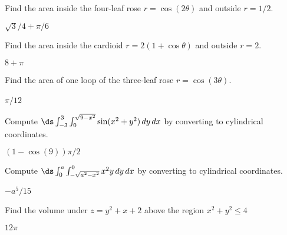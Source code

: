 \begin{exercises}
\begin{exercise} Find the area inside the four-leaf rose $r=\cos(2\theta)$
and outside $r=1/2$.
\begin{answer} $\sqrt3/4+\pi/6$
\end{answer}\end{exercise}

\begin{exercise} Find the area inside the cardioid $r=2(1+\cos\theta)$
and outside $r=2$.
\begin{answer} $8+\pi$
\end{answer}\end{exercise}


\begin{exercise}  \relax\label{exer:area of three-leaf rose loop}
Find the area of one loop of the three-leaf rose
 $r=\cos(3\theta)$.
\begin{answer} $\pi/12$\
\end{answer}\end{exercise}

\begin{exercise} Compute $\ds \int_{-3}^3\int_0^{\sqrt{9-x^2}}
\sin(x^2+y^2)\,dy\,dx$ by converting to cylindrical coordinates.
\begin{answer} $(1-\cos(9))\pi/2$
\end{answer}\end{exercise}

\begin{exercise} Compute $\ds \int_{0}^a\int_{-\sqrt{a^2-x^2}}^0 x^2y\,dy\,dx$ 
by converting to cylindrical coordinates.
\begin{answer} $-a^5/15$
\end{answer}\end{exercise}



\begin{exercise} Find the volume under $z=y^2+x+2$ above
the region $x^2+y^2\le 4$
\begin{answer} $12\pi$
\end{answer}\end{exercise}


\end{exercises}
